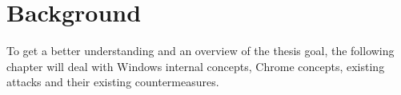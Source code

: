 \section{Background}
\label{sec:background}
To get a better understanding and an overview of the thesis goal, the following chapter will deal with Windows internal concepts, Chrome concepts, existing attacks and their existing countermeasures.



